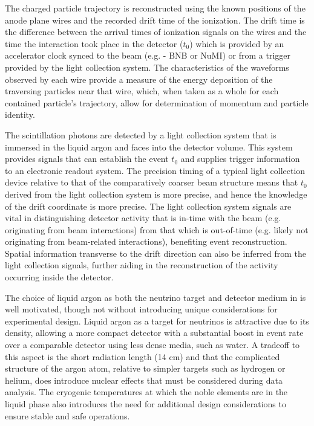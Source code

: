 The charged particle trajectory is reconstructed using the known positions of the anode plane wires and the recorded drift time of the ionization.  The drift time is the difference between the arrival times of ionization signals on the wires and the time the interaction took place in the detector ($t_0$) which is provided by an accelerator clock synced to the beam (e.g. - BNB or NuMI) or from a trigger provided by the light collection system.  The characteristics of the waveforms observed by each wire provide a measure of the energy deposition of the traversing particles near that wire, which, when taken as a whole for each contained particle's trajectory, allow for determination of momentum and particle identity. 


The scintillation photons are detected by a light collection system that is immersed in the liquid argon and faces into the detector volume.  This system provides signals that can establish the event $t_0$ and supplies trigger information to an electronic readout system.  The precision timing of a typical light collection device relative to that of the comparatively coarser beam structure means that $t_0$ derived from the light collection system is more precise, and hence the knowledge of the drift coordinate is more precise.  The light collection system signals are vital in distinguishing detector activity that is in-time with the beam (e.g. originating from beam interactions) from that which is out-of-time (e.g. likely not originating from beam-related interactions), benefiting event reconstruction.  Spatial information transverse to the drift direction can also be inferred from the light collection signals, further aiding in the reconstruction of the activity occurring inside the detector.


The choice of liquid argon as both the neutrino target and detector medium in \lartpcs is well motivated, though not without introducing unique considerations for experimental design.  Liquid argon as a target for neutrinos is attractive due to its density, allowing a more compact detector with a substantial boost in event rate over a comparable detector using less dense media, such as water.  A tradeoff to this aspect is the short radiation length (14 cm) and that the complicated structure of the argon atom, relative to simpler targets such as hydrogen or helium, does introduce nuclear effects that must be considered during data analysis.  The cryogenic temperatures at which the noble elements are in the liquid phase also introduces the need for additional design considerations to ensure stable and safe operations.

